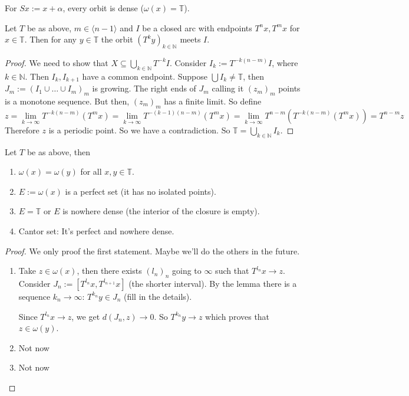 \documentclass{article}
\newcommand*{\N}{\mathbb{N}}
\newcommand*{\T}{\mathbb{T}}
\newcommand*{\jbr}[1]{{\langle #1 \rangle}}
\begin{document}
\begin{rec}
    For $Sx:=x+\alpha$, every orbit is dense ($\omega(x)=\T$).
\end{rec}

\begin{lem}
    Let $T$ be as above, $m \in \jbr{n-1}$ and $I$ be a closed arc with endpoints $T^nx, T^mx$ for $x\in\T$. Then for any $y\in\T$ the orbit $(T^ky)_{k\in\N}$ meets $I$.
\end{lem}

\begin{proof}
    We need to show that $X\subseteq \bigcup_{k\in\N}T^{-k}I$. Consider $I_k:=T^{-k(n-m)}I$, where $k\in\N$. Then $I_k,I_{k+1}$ have a common endpoint. Suppose $\bigcup I_k \neq \T$, then $J_m := (I_1\cup\dots\cup I_m)_m$ is growing. The right ends of $J_m$ calling it $(z_m)_m$ points is a monotone sequence. But then, $(z_m)_m$ has a finite limit. So define
    $$z=\lim_{k\to\infty} T^{-k(n-m)}(T^mx) = \lim_{k\to\infty}T^{-(k-1)(n-m)}(T^mx) = \lim_{k\to\infty}T^{n-m}(T^{-k(n-m)}(T^mx)) = T^{n-m}z$$
    Therefore $z$ is a periodic point. So we have a contradiction. So $\T = \bigcup_{k\in\N}I_k$.
\end{proof}

\begin{prop}
    Let $T$ be as above, then
    \begin{enumerate}
        \item $\omega(x)=\omega(y)$ for all $x,y\in\T$.

        \item $E:=\omega(x)$ is a perfect set (it has no isolated points).

        \item $E=\T$ or $E$ is nowhere dense (the interior of the closure is empty).

        \item Cantor set: It's perfect and nowhere dense.
    \end{enumerate}
\end{prop}

\begin{proof}
    We only proof the first statement. Maybe we'll do the others in the future.
    \begin{enumerate}
        \item Take $z\in\omega(x)$, then there exists $(l_n)_n$ going to $\infty$ such that $T^{l_n}x\to z$. Consider $J_n:=[T^{l_n}x,T^{l_{n+1}}x]$ (the shorter interval). By the lemma there is a sequence $k_n\to\infty$: $T^{k_n}y\in J_n$ (fill in the details).

        Since $T^{l_n}x\to z$, we get $d(J_n,z)\to0$. So $T^{k_n}y\to z$ which proves that $z\in \omega(y)$.

        \item Not now

        \item Not now
    \end{enumerate}
\end{proof}
\end{document}
